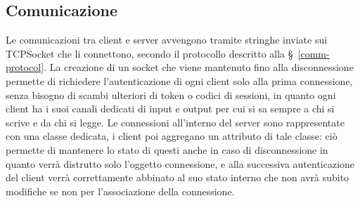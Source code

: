 \subsection{Comunicazione}

Le comunicazioni tra client e server avvengono tramite stringhe inviate sui TCPSocket che li connettono, secondo il protocollo descritto alla \S\ \ref{comm-protocol}. La creazione di un socket che viene mantenuto fino alla disconnessione permette di richiedere l'autenticazione di ogni client solo alla prima connessione, senza bisogno di scambi ulteriori di token o codici di sessioni, in quanto ogni client ha i suoi canali dedicati di input e output per cui si sa sempre a chi si scrive e da chi si legge. Le connessioni all'interno del server sono rappresentate con una classe dedicata, i client poi aggregano un attributo di tale classe: ciò permette di mantenere lo stato di questi anche in caso di disconnessione in quanto verrà distrutto solo l'oggetto connessione, e alla successiva autenticazione del client verrà correttamente abbinato al suo stato interno che non avrà subito modifiche se non per l'associazione della connessione.
